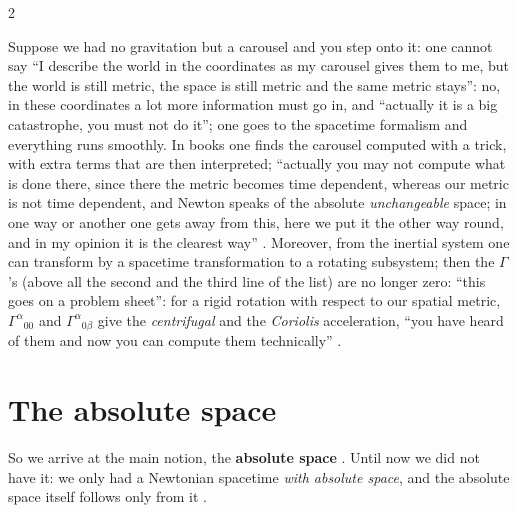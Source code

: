 \begin{paracol}{2}
\begin{secondary}
Suppose we had no gravitation but a carousel and you step onto it: one cannot say ``I describe the world in the coordinates as my carousel gives them to me, but the world is still metric, the space is still metric and the same metric stays'': no, in these coordinates a lot more information must go in, and
``actually it is a big catastrophe, you must not do it''; one goes to the spacetime formalism and everything runs smoothly. In books one finds the carousel computed with a trick, with extra terms that are then interpreted; ``actually you may not compute what is done there, since there the metric becomes time dependent, whereas our metric is not time
dependent, and Newton speaks of the absolute \emph{unchangeable} space; in one way or another one gets away from this, here we put it the other way round, and in my opinion it is the clearest way'' . Moreover, from the inertial system one can transform by a spacetime transformation to a rotating subsystem; then
the $\Gamma$'s (above all the second and the third line of the list) are no longer zero: ``this goes on a problem sheet'': for a rigid rotation with respect to our spatial metric, $\Gamma^\alpha{}_{00}$ and $\Gamma^\alpha{}_{0\beta}$ give the \emph{centrifugal} and the \emph{Coriolis} acceleration, ``you have heard of them and now you can compute them technically''
.
\end{secondary}

\section{The absolute space}\label{sec:as-absolute}

So we arrive at the main notion, the \textbf{absolute space} . Until now we did not have it: we only had a Newtonian spacetime \emph{with absolute space}, and the absolute space itself follows only from it .


\end{paracol}
